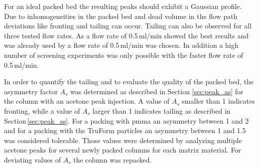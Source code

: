 For an ideal packed bed the resulting peaks should exhibit a Gaussian profile. Due to inhomogeneities in the packed bed and dead volume in the flow path deviations like fronting and tailing can occur. Tailing can also be observed for all three tested flow rates. As a flow rate of 0.5\,ml/min showed the best results and was already used by \cite{AndreMaster} a flow rate of 0.5\,ml/min was chosen. In addition a high number of screening experiments was only possible with the faster flow rate of 0.5\,ml/min.       

In order to quantify the tailing and to evaluate the quality of the packed bed, the asymmetry factor $A_{s}$ was determined as described in Section \ref{sec:peak_as} for the column with an acetone peak injection. A value of $A_{s}$ smaller than 1 indicates fronting, while a value of $A_{s}$ larger than 1 indicates tailing as described in Section\,\ref{sec:peak_as}. For a packing with \gls{pmma} an asymmetry between 1 and 2 and for a packing with the TruForm particles an asymmetry between 1 and 1.5 was considered tolerable. Those values were determined by analyzing multiple acetone peaks for several newly packed columns for each matrix material. For deviating values of $A_{s}$ the column was repacked. 
\FloatBarrier
%         



